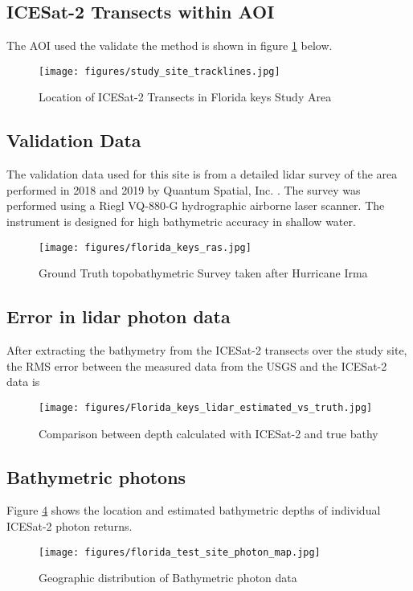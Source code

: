 \subsection{ICESat-2 Transects within AOI}
The AOI used the validate the method is shown in figure \ref{fig:keys_transects} below.
\begin{figure}[h!]
    \centering
    \texttt{[image: figures/study\_site\_tracklines.jpg]}
    \caption{Location of ICESat-2 Transects in Florida keys Study Area}
    \label{fig:keys_transects}
\end{figure}
\subsection{Validation Data}
The validation data used for this site is from a detailed lidar survey of the area performed in 2018 and 2019 by Quantum Spatial, Inc. \parencite{Keys2019Lidar}. The survey was performed using a Riegl VQ-880-G hydrographic airborne laser scanner. The instrument is designed for high bathymetric accuracy in shallow water.
\begin{figure}[h!]
    \centering
    \texttt{[image: figures/florida\_keys\_ras.jpg]}
    \caption{Ground Truth topobathymetric Survey taken after Hurricane Irma}
    \label{fig:truebathy}
\end{figure}
\subsection{Error in lidar photon data}
After extracting the bathymetry from the ICESat-2 transects over the study site, the RMS error between the measured data from the USGS and the ICESat-2 data is
\begin{figure}[htbp]
    \centering
    \texttt{[image: figures/Florida\_keys\_lidar\_estimated\_vs\_truth.jpg]}
    \caption{Comparison between depth calculated with ICESat-2 and true bathy}
    \label{fig:fl_truth_vs_measured_points}
\end{figure}
% 

% 

\subsection{Bathymetric photons}
Figure \ref{fig:bathyphotonmap} shows the location and estimated bathymetric depths of individual ICESat-2 photon returns.
\begin{figure}[h!]
    \centering
    \texttt{[image: figures/florida\_test\_site\_photon\_map.jpg]}
    \caption{Geographic distribution of Bathymetric photon data}
    \label{fig:bathyphotonmap}
\end{figure}

